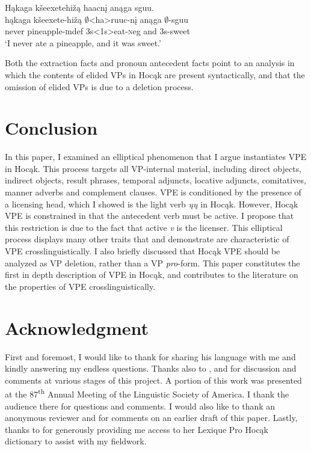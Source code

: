 \documentclass[output=paper]{LSP/langsci}
\begin{document}
\ea\label{ex:johnson:52}
\glll Hąkaga kšeexetehižą haacnį anąga sguu.\\
hąkaga kšeexete-hižą $\emptyset$<ha>ruuc-nį anąga $\emptyset$-sguu\\
never pineapple-{\textsc indef} {\textsc 3s<1s>}eat-{\textsc neg} and {\textsc 3s}-sweet\\
\trans `I never ate a pineapple, and it was sweet.'
\z


Both the extraction facts and pronoun antecedent facts point to an analysis in which the contents of elided VPs in Hocąk are present syntactically, and that the omission of elided VPs is due to a deletion process.

\section{Conclusion}\label{sec:johnson:5}

In this paper, I examined an elliptical phenomenon that I argue instantiates VPE in Hocąk. This process targets all VP-internal material, including direct objects, indirect objects, result phrases, temporal adjuncts, locative adjuncts, comitatives, manner adverbs and complement clauses. VPE is conditioned by the presence of a licensing head, which I showed is the light verb \emph{ųų} in Hocąk. However, Hocąk VPE is constrained in that the antecedent verb must be active. I propose that this restriction is due to the fact that active \emph{v} is the licenser. This elliptical process displays many other traits that \citet{Goldberg2005} and \citet{Fortin2007} demonstrate are characteristic of VPE crosslinguistically. I also briefly discussed that Hocąk VPE should be analyzed as VP deletion, rather than a VP \emph{pro}-form. This paper constitutes the first in depth description of VPE in Hocąk, and contributes to the literature on the properties of VPE crosslinguistically. 

\section*{Acknowledgment}

First and foremost, I would like to thank  for sharing his language with me and kindly answering my endless questions. Thanks also to ,  and  for discussion and comments at various stages of this project. A portion of this work was presented at the 87\textsuperscript{th} Annual Meeting of the Linguistic Society of America. I thank the audience there for questions and comments. I would also like to thank an anonymous reviewer and  for comments on an earlier draft of this paper. Lastly, thanks to  for generously providing me access to her Lexique Pro Hocąk dictionary to assist with my fieldwork.
\end{document}
